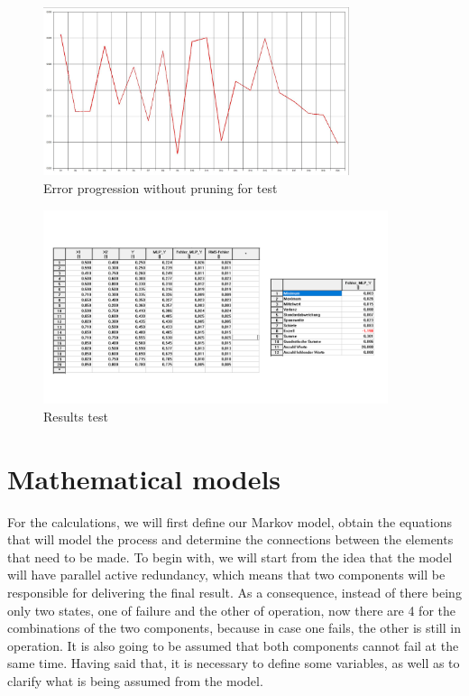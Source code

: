 \documentclass{article}
\begin{document}
\begin{doublespacing}
\begin{figure}[H] 
    \centering
    \includegraphics[width=0.8\textwidth]{Images/Photos/ErrorOP2.JPG} 
    \caption{Error progression without pruning for test} 
    \label{fig:ErrorOP2} 
\end{figure}

\begin{figure}[H] 
    \centering
    \includegraphics[width=0.9\textwidth]{Images/Fotos/Diapositiva12.PNG} 
    \caption{Results test} 
    \label{fig:ResultsTest} 
\end{figure}







\newpage

\section{Mathematical models}

\par For the calculations, we will first define our Markov model, obtain the equations that will model the process and determine the connections between the elements that need to be made. To begin with, we will start from the idea that the model will have parallel active redundancy, which means that two components will be responsible for delivering the final result. As a consequence, instead of there being only two states, one of failure and the other of operation, now there are 4 for the combinations of the two components, because in case one fails, the other is still in operation. It is also going to be assumed that both components cannot fail at the same time.  Having said that, it is necessary to define some variables, as well as to clarify what is being assumed from the model.


\end{doublespacing}
\end{document}
